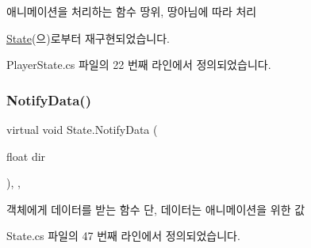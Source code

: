 애니메이션을 처리하는 함수\textquotesingle{} 땅위, 땅아님에 따라 처리 



\mbox{\hyperlink{class_state_aa064ec6cd84d4a09b2c72a536125c74b}{State}}(으)로부터 재구현되었습니다.



Player\+State.\+cs 파일의 22 번째 라인에서 정의되었습니다.


\begin{DoxyCode}{0}

\end{DoxyCode}
\mbox{\label{class_state_a7c2adea0228ec1582cd5bda7b36d245e}} 
\subsubsection{\texorpdfstring{NotifyData()}{NotifyData()}}
{\footnotesize\ttfamily virtual void State.\+Notify\+Data (\begin{DoxyParamCaption}\item[{float}]{dir }\end{DoxyParamCaption})\hspace{0.3cm}{\ttfamily [inline]}, {\ttfamily [virtual]}, {\ttfamily [inherited]}}



객체에게 데이터를 받는 함수 단, 데이터는 애니메이션을 위한 값 



State.\+cs 파일의 47 번째 라인에서 정의되었습니다.


